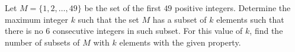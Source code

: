 Let $M=\{1,2,\dots,49\}$ be the set of the first $49$ positive integers. Determine the maximum integer $k$ such that the set $M$ has a subset of $k$ elements such that there is no $6$ consecutive integers in such subset. For this value of $k$,  find the number of subsets of $M$ with $k$ elements with the given property.
